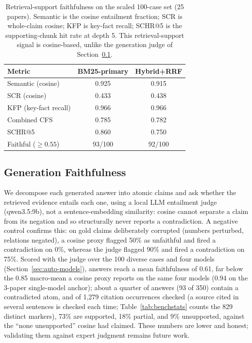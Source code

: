 \documentclass[11pt,letterpaper]{article}
\begin{document}
\begin{table}[t]
  \centering
  \caption{Retrieval-support faithfulness on the scaled 100-case set (25 papers). Semantic
           is the cosine entailment fraction; SCR is whole-claim cosine; KFP is key-fact
           recall; SCHR@5 is the supporting-chunk hit rate at depth 5. This retrieval-support
           signal is cosine-based, unlike the generation judge of Section~\ref{sec:auto-gen}.}
  \label{tab:faith}
  \setlength{\tabcolsep}{5pt}
  \begin{tabular}{lcc}
    \toprule
    \textbf{Metric} & \textbf{BM25-primary} & \textbf{Hybrid+RRF} \\
    \midrule
    Semantic (cosine)    & 0.925 & 0.915 \\
    SCR (cosine)         & 0.433 & 0.438 \\
    KFP (key-fact recall)& 0.966 & 0.966 \\
    Combined CFS         & 0.785 & 0.782 \\
    SCHR@5               & 0.860 & 0.750 \\
    Faithful ($\geq0.55$)& 93/100 & 92/100 \\
    \bottomrule
  \end{tabular}
\end{table}

\subsection{Generation Faithfulness}
\label{sec:auto-gen}
We decompose each generated answer into atomic claims and ask whether the retrieved evidence
entails each one, using a local LLM entailment judge (qwen3.5:9b), not a sentence-embedding
similarity: cosine cannot separate a claim from its negation and so structurally never reports a
contradiction. A negative control confirms this: on gold claims deliberately corrupted (numbers
perturbed, relations negated), a cosine proxy flagged 50\% as unfaithful and fired a contradiction
on 0\%, whereas the judge flagged 90\% and fired a contradiction on 75\%. Scored with the judge
over the 100 diverse cases and four models (Section~\ref{sec:auto-models}), answers reach a mean
faithfulness of 0.61, far below the 0.85 macro-mean a cosine proxy reports on the same four models
(0.94 on the 3-paper single-model anchor); about a quarter of answers (93 of
350) contain a contradicted atom, and of 1{,}279 citation occurrences checked (a source cited in
several sentences is checked each time; Table~\ref{tab:benchstats} counts the 829 distinct
markers), 73\% are supported, 18\%
partial, and 9\% unsupported, against the ``none unsupported'' cosine had claimed. These numbers
are lower and honest; validating them against expert judgment remains future work.
\end{document}
